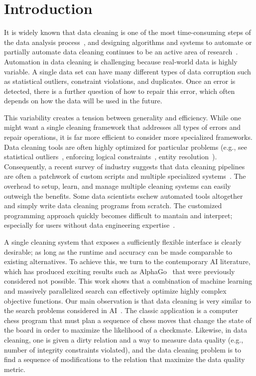 \section{Introduction}\label{intro}\sloppy
It is widely known that data cleaning is one of the most time-consuming steps of the data analysis process~\cite{nytimes}, and
designing algorithms and systems to automate or partially automate data cleaning continues to be an active area of research~\cite{DBLP:conf/sigmod/ChuIKW16}.
Automation in data cleaning is challenging because real-world data is highly variable. 
A single data set can have many different types of data corruption such as statistical outliers, constraint violations, and duplicates.
Once an error is detected, there is a further question of how to repair this error, which often depends on how the data will be used in the future.

This variability creates a tension between generality and efficiency.
While one might want a single cleaning framework that addresses all types of errors and repair operations, it is far more efficient to consider more specialized frameworks.
Data cleaning tools are often highly optimized for particular problems  (e.g., see statistical outliers~\cite{hellerstein2008quantitative}, enforcing logical constraints~\cite{DBLP:conf/sigmod/ChuIKW16}, entity resolution~\cite{DBLP:journals/pvldb/KopckeTR10}). 
Consequently, a recent survey of industry suggests that data cleaning pipelines are often a patchwork of custom scripts and multiple specialized systems~\cite{krishnan2016hilda}.
The overhead to setup, learn, and manage multiple cleaning systems can easily outweigh the benefits.
Some data scientists eschew automated tools altogether and simply write data cleaning programs from scratch.
The customized programming approach quickly becomes difficult to mantain and interpret; especially for users without data engineering expertise~\cite{sculley2014machine}.

A single cleaning system that exposes a sufficiently flexible interface is clearly desirable; as long as the runtime and accuracy can be made comparable to existing alternatives.  
To achieve this, we turn to the contemporary AI literature, which has produced exciting results such as AlphaGo~\cite{silver2016mastering} that were previously considered not possible.    This work shows that a combination of machine learning and massively parallelized search can effectively optimize highly complex objective functions.
Our main observation is that data cleaning is very similar to the search problems considered in AI~\cite{russell1995modern}.
The classic application is a computer chess program that must plan a sequence of chess moves that change the state of the board in order to maximize the likelihood of a checkmate. Likewise, in data cleaning, one is given a dirty relation and a way to measure data quality (e.g., number of integrity constraints violated), and the data cleaning problem is to find a sequence of modifications to the relation that maximize the data quality metric.

